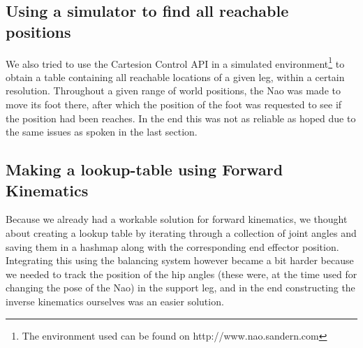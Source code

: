 \documentclass[a4paper]{article}
\begin{document}
\subsection{Using a simulator to find all reachable positions}
We also tried to use the Cartesion Control API in
a simulated environment\footnote{The environment used can be found on
http://www.nao.sandern.com} to obtain a table containing all reachable locations
of a given leg, within a certain resolution.
Throughout a given range of world positions, the Nao was made to move its foot
there, after which the position of the foot was requested to see if the position
had been reaches.
In the end this was not as reliable as hoped due to the same issues as spoken in
the last section.

\subsection{Making a lookup-table using Forward Kinematics}
Because we already had a workable solution for forward kinematics, we thought
about creating a lookup table by iterating through a collection of joint angles
and saving them in a hashmap along with the corresponding end effector position.
Integrating this using the balancing system however became a bit harder because
we needed to track the position of the hip angles (these were, at the time used
for changing the pose of the Nao) in the support leg, and in the end
constructing the inverse kinematics ourselves was an easier solution.



\end{document}
